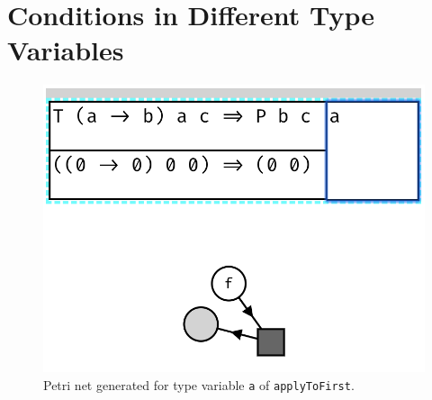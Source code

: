 \documentclass[11pt,openright,hidelinks,a4paper]{article}
\begin{document}
\newpage



\newpage

\appendix

\section{Conditions in Different Type Variables}\label{app:differentvars}

\begin{figure}[H]
\begin{center}
\includegraphics[scale=0.45]{applytofirsta}
\end{center}
\caption{Petri net generated for type variable \lstinline{a} of \lstinline{applyToFirst}.}
\label{fig:applyToFirstA}
\end{figure}
\end{document}
